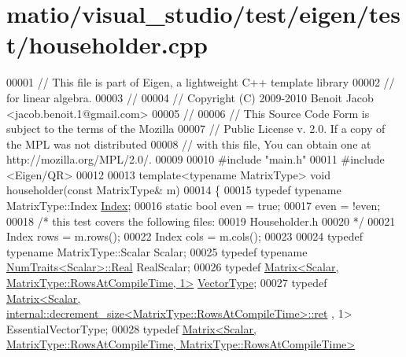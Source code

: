 \hypertarget{matio_2visual__studio_2test_2eigen_2test_2householder_8cpp_source}{}\section{matio/visual\+\_\+studio/test/eigen/test/householder.cpp}
\label{matio_2visual__studio_2test_2eigen_2test_2householder_8cpp_source}

\begin{DoxyCode}
00001 \textcolor{comment}{// This file is part of Eigen, a lightweight C++ template library}
00002 \textcolor{comment}{// for linear algebra.}
00003 \textcolor{comment}{//}
00004 \textcolor{comment}{// Copyright (C) 2009-2010 Benoit Jacob <jacob.benoit.1@gmail.com>}
00005 \textcolor{comment}{//}
00006 \textcolor{comment}{// This Source Code Form is subject to the terms of the Mozilla}
00007 \textcolor{comment}{// Public License v. 2.0. If a copy of the MPL was not distributed}
00008 \textcolor{comment}{// with this file, You can obtain one at http://mozilla.org/MPL/2.0/.}
00009 
00010 \textcolor{preprocessor}{#include "main.h"}
00011 \textcolor{preprocessor}{#include <Eigen/QR>}
00012 
00013 \textcolor{keyword}{template}<\textcolor{keyword}{typename} MatrixType> \textcolor{keywordtype}{void} householder(\textcolor{keyword}{const} MatrixType& m)
00014 \{
00015   \textcolor{keyword}{typedef} \textcolor{keyword}{typename} MatrixType::Index \hyperlink{namespace_eigen_a62e77e0933482dafde8fe197d9a2cfde}{Index};
00016   \textcolor{keyword}{static} \textcolor{keywordtype}{bool} even = \textcolor{keyword}{true};
00017   even = !even;
00018   \textcolor{comment}{/* this test covers the following files:}
00019 \textcolor{comment}{     Householder.h}
00020 \textcolor{comment}{  */}
00021   Index rows = m.rows();
00022   Index cols = m.cols();
00023 
00024   \textcolor{keyword}{typedef} \textcolor{keyword}{typename} MatrixType::Scalar Scalar;
00025   \textcolor{keyword}{typedef} \textcolor{keyword}{typename} \hyperlink{group___core___module_struct_eigen_1_1_num_traits}{NumTraits<Scalar>::Real} RealScalar;
00026   \textcolor{keyword}{typedef} \hyperlink{group___core___module_class_eigen_1_1_matrix}{Matrix<Scalar, MatrixType::RowsAtCompileTime, 1>} 
      \hyperlink{struct_vector_type}{VectorType};
00027   \textcolor{keyword}{typedef} 
      \hyperlink{group___core___module_class_eigen_1_1_matrix}{Matrix<Scalar, internal::decrement\_size<MatrixType::RowsAtCompileTime>::ret}
      , 1> EssentialVectorType;
00028   \textcolor{keyword}{typedef} 
      \hyperlink{group___core___module_class_eigen_1_1_matrix}{Matrix<Scalar, MatrixType::RowsAtCompileTime, MatrixType::RowsAtCompileTime>}

\end{DoxyCode}
